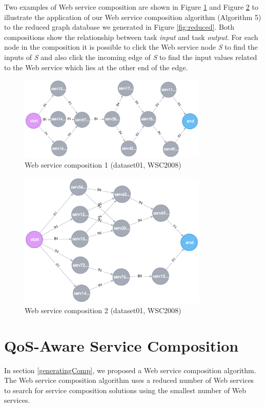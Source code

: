 Two examples of Web service composition are shown in Figure \ref{fig:compEg1} and Figure \ref{fig:compEg2} to illustrate the application of our Web service composition algorithm (Algorithm 5) to the reduced graph database we generated in Figure \ref{fig:reduced}. Both compositions show the relationship between task \emph{input} and task \emph{output}. For each node in the composition it is possible to click the Web service node \emph{S} to find the inputs of \emph{S} and also click the incoming edge of \emph{S} to find the input values related to the Web service which lies at the other end of the edge. \par
\begin{figure}[H]
\includegraphics[width=9cm]{web-service-composition-1.png}
\centering
\caption{Web service composition 1 (dataset01, WSC2008)}
\label{fig:compEg1} 
\end{figure} 

\begin{figure}[H]
\includegraphics[width=9cm]{web-service-composition-2.png}
\centering
\caption{Web service composition 2 (dataset01, WSC2008)}
\label{fig:compEg2} 
\end{figure} 

\section{QoS-Aware Service Composition}
In section \ref{generatingComp}, we proposed a Web service composition algorithm. The Web service composition algorithm uses a reduced number of Web services to search for service composition solutions using the smallest number of Web services.\par

